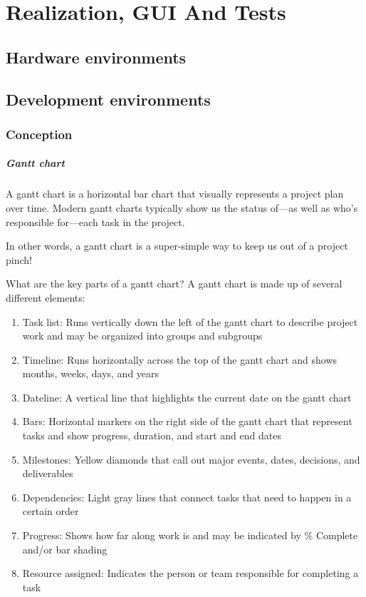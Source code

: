 

\setcounter{mtc}{10}

\chapter{Realization, GUI And Tests}%
\label{chap:chapter_four}
\minitoc

\section{Hardware environments}
\section{Development environments}
\subsection{Conception}


\paragraph{Gantt chart}
A gantt chart is a horizontal bar chart that visually represents a project plan over time. Modern gantt charts typically show us the status of—as well as who’s responsible for—each task in the project.

In other words, a gantt chart is a super-simple way to keep us out of a project pinch!

What are the key parts of a gantt chart?
A gantt chart is made up of several different elements:
\begin{enumerate}
      \item
            Task list: Runs vertically down the left of the gantt chart to describe project work and may be organized into groups and subgroups
      \item
            Timeline: Runs horizontally across the top of the gantt chart and shows months, weeks, days, and years
      \item
            Dateline: A vertical line that highlights the current date on the gantt chart
      \item
            Bars: Horizontal markers on the right side of the gantt chart that represent tasks and show progress, duration, and start and end dates
      \item
            Milestones: Yellow diamonds that call out major events, dates, decisions, and deliverables
      \item
            Dependencies: Light gray lines that connect tasks that need to happen in a certain order
      \item
            Progress: Shows how far along work is and may be indicated by \% Complete and/or bar shading
      \item
            Resource assigned: Indicates the person or team responsible for completing a task
\end{enumerate}


